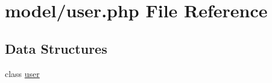 \hypertarget{user_8php}{}\section{model/user.php File Reference}
\label{user_8php}
\subsection*{Data Structures}
\begin{DoxyCompactItemize}
\item 
class \hyperlink{classuser}{user}
\end{DoxyCompactItemize}
